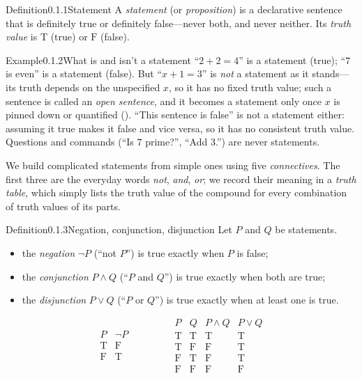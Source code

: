 \documentclass[main.tex]{subfiles}
\begin{document}
\begin{Obj}{Definition}{0.1.1}{Statement}
A \emph{statement} (or \emph{proposition}) is a declarative sentence that is definitely true or
definitely false---never both, and never neither. Its \emph{truth value} is $\mathrm{T}$ (true) or
$\mathrm{F}$ (false).
\end{Obj}

\begin{ObjL}{Example}{0.1.2}{What is and isn't a statement}
``$2+2=4$'' is a statement (true); ``$7$ is even'' is a statement (false). But ``$x+1=3$'' is
\emph{not} a statement as it stands---its truth depends on the unspecified $x$, so it has no fixed
truth value; such a sentence is called an \emph{open sentence}, and it becomes a statement only once
$x$ is pinned down or quantified (). ``This sentence is false'' is not a statement either:
assuming it true makes it false and vice versa, so it has no consistent truth value. Questions and
commands (``Is $7$ prime?'', ``Add $3$.'') are never statements.
\end{ObjL}

\noindent We build complicated statements from simple ones using five \emph{connectives}. The first
three are the everyday words \emph{not}, \emph{and}, \emph{or}; we record their meaning in a
\emph{truth table}, which simply lists the truth value of the compound for every combination of truth
values of its parts.

\begin{Obj}{Definition}{0.1.3}{Negation, conjunction, disjunction}
Let $P$ and $Q$ be statements.
\begin{itemize}
  \item the \emph{negation} $\neg P$ (``not $P$'') is true exactly when $P$ is false;
  \item the \emph{conjunction} $P\wedge Q$ (``$P$ and $Q$'') is true exactly when both are true;
  \item the \emph{disjunction} $P\vee Q$ (``$P$ or $Q$'') is true exactly when at least one is true.
\end{itemize}
\[
\begin{array}{c|c}
P & \neg P\\\hline
\mathrm{T} & \mathrm{F}\\
\mathrm{F} & \mathrm{T}
\end{array}
\qquad\qquad
\begin{array}{cc|cc}
P & Q & P\wedge Q & P\vee Q\\\hline
\mathrm{T}&\mathrm{T}&\mathrm{T}&\mathrm{T}\\
\mathrm{T}&\mathrm{F}&\mathrm{F}&\mathrm{T}\\
\mathrm{F}&\mathrm{T}&\mathrm{F}&\mathrm{T}\\
\mathrm{F}&\mathrm{F}&\mathrm{F}&\mathrm{F}
\end{array}
\]
\end{Obj}
\end{document}
